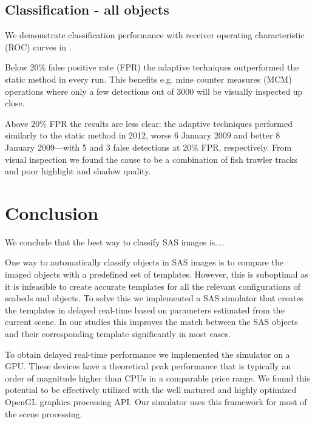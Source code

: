 \subsection{Classification - all objects}

We demonstrate classification performance with receiver operating characteristic (ROC) curves in . 

Below 20\% false positive rate (FPR) the adaptive techniques outperformed the static method in every run. This benefits e.g. mine counter measures (MCM) operations where only a few detections out of 3000 will be visually inspected up close.

Above 20\% FPR the results are less clear: the adaptive techniques performed similarly to the static method in 2012, worse 6 January 2009 and better 8 January 2009---with 5 and 3 false detections at 20\% FPR, respectively. From visual inspection we found the cause to be a combination of fish trawler tracks and poor highlight and shadow quality.



\section{Conclusion}\label{IV_conclusion}


We conclude that the best way to classify SAS images is....

One way to automatically classify objects in SAS images is to compare the imaged objects with a predefined set of templates. However, this is suboptimal as it is infeasible to create accurate templates for all the relevant configurations of seabeds and objects. To solve this we implemented a SAS simulator that creates the templates in delayed real-time based on parameters estimated from the current scene. In our studies this improves the match between the SAS objects and their corresponding template significantly in most cases.

To obtain delayed real-time performance we implemented the simulator on a GPU. These devices have a theoretical peak performance that is typically an order of magnitude higher than CPUs in a comparable price range. We found this potential to be effectively utilized with the well matured and highly optimized OpenGL graphics processing API. Our simulator uses this framework for most of the scene processing.

